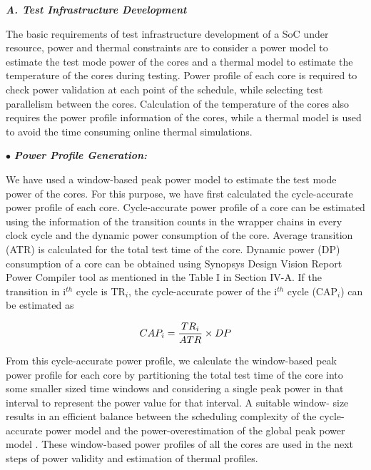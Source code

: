 \documentclass[conference]{IEEEtran}
\begin{document}
\textbf{\textit{A. Test Infrastructure Development}}\\

	\par
	The basic requirements of test infrastructure development
of a SoC under resource, power and thermal constraints are to
consider a power model to estimate the test mode power of the
cores and a thermal model to estimate the temperature of the
cores during testing. Power profile of each core is required to
check power validation at each point of the schedule, while
selecting test parallelism between the cores. Calculation of
the temperature of the cores also requires the power profile
information of the cores, while a thermal model is used to
avoid the time consuming online thermal simulations.

$\bullet$ \hspace{1 cm} \textbf{\textit{Power Profile Generation:}}

	\par
	We have used a window-based peak power model \cite{karmakar2015window} to
estimate the test mode power of the cores. For this purpose,
we have first calculated the cycle-accurate power profile of
each core. Cycle-accurate power profile of a core can be
estimated using the information of the transition counts in
the wrapper chains in every clock cycle and the dynamic
power consumption of the core. Average transition (ATR) is
calculated for the total test time of the core. Dynamic power
(DP) consumption of a core can be obtained using Synopsys
Design Vision Report Power Compiler tool \cite{lettnin2004synthesis} as mentioned
in the Table I in Section IV-A. If the transition in i$^{th}$ cycle
is TR$_{i}$, the cycle-accurate power of the i$^{th}$ cycle (CAP$_{i}$) can
be estimated as

\begin{equation}
CAP_{i} = \frac{TR_{i}}{ATR} \times DP\\
\end{equation}

From this cycle-accurate power profile, we calculate the
window-based peak power profile for each core by partitioning
the total test time of the core into some smaller sized time
windows and considering a single peak power in that interval to
represent the power value for that interval. A suitable window-
size results in an efficient balance between the scheduling
complexity of the cycle-accurate power model \cite{samii2008cycle} and the
power-overestimation of the global peak power model \cite{chou1997scheduling}.
These window-based power profiles of all the cores are used
in the next steps of power validity and estimation of thermal
profiles.
\end{document}
